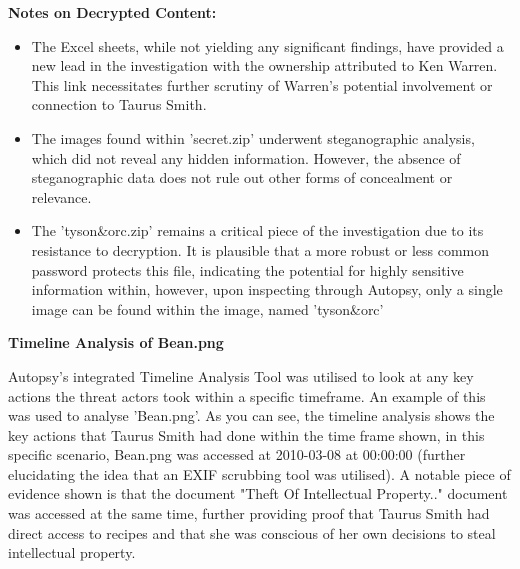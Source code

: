 \textbf{Notes on Decrypted Content:}
\begin{itemize}
    \item The Excel sheets, while not yielding any significant findings, have provided a new lead in the investigation with the ownership attributed to Ken Warren. This link necessitates further scrutiny of Warren's potential involvement or connection to Taurus Smith.
    \item The images found within 'secret.zip' underwent steganographic analysis, which did not reveal any hidden information. However, the absence of steganographic data does not rule out other forms of concealment or relevance.
    \item The 'tyson\&orc.zip' remains a critical piece of the investigation due to its resistance to decryption. It is plausible that a more robust or less common password protects this file, indicating the potential for highly sensitive information within, however, upon inspecting through Autopsy, only a single image can be found within the image, named 'tyson\&orc'
\end{itemize}

\textbf{Timeline Analysis of Bean.png}

Autopsy's integrated Timeline Analysis Tool was utilised to look at any key actions the threat actors took within a specific timeframe. An example of this was used to analyse 'Bean.png'. As you can see, the timeline analysis shows the key actions that Taurus Smith had done within the time frame shown, in this specific scenario, Bean.png was accessed at 2010-03-08 at 00:00:00 (further elucidating the idea that an EXIF scrubbing tool was utilised). A notable piece of evidence shown is that the document "Theft Of Intellectual Property.." document was accessed at the same time, further providing proof that Taurus Smith had direct access to recipes and that she was conscious of her own decisions to steal intellectual property.

